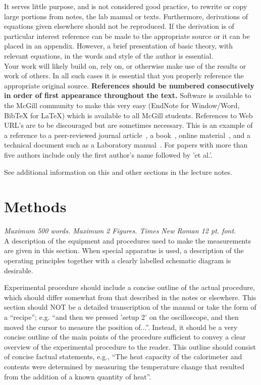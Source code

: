\documentclass[letterpaper,12pt]{article}
\begin{document}
It serves little purpose, and is not considered good practice, to
rewrite or copy large portions from notes, the lab manual or
texts. Furthermore, derivations of equations given elsewhere should
not be reproduced. If the derivation is of particular interest
reference can be made to the appropriate source or it can be placed in
an appendix. However, a brief presentation of basic theory, with
relevant equations, in the words and style of the author is
essential.\\

Your work will likely build on, rely on, or otherwise make use of the results or work of others.  In all such cases it is essential that you properly reference the appropriate
  original source.  {\bf References should be numbered consecutively in
  order of first appearance throughout the text.} Software is available
  to the McGill community to make this very easy (EndNote for
  Window/Word, BibTeX for LaTeX) which is available to all McGill
  students.  References to Web URL's are to be discouraged but are
  sometimes necessary.  This is an example of a reference to a peer-reviewed journal article~\cite{paper1}, a book~\cite{book1}, online material~\cite{link1}, and a technical document such as a Laboratory manual~\cite{LabManualX}.  For papers with more than five authors include only the first author's name followed by ’et al.’.

See additional information on this and other sections in the lecture
notes.





\section{Methods}
{\it Maximum 500 words. Maximum 2 Figures. Times New Roman 12
  pt. font.}\\


A description of the equipment and procedures used to make the
measurements are given in this section. When special apparatus is
used, a description of the operating principles together with a
clearly labelled schematic diagram is desirable. 

Experimental procedure should include a concise outline of the
        actual procedure, which should differ somewhat from that
        described in the notes or elsewhere. This section should NOT
        be a detailed transcription of the manual or take the form of
        a ``recipe''; e.g. ``and then we pressed 'setup 2' on the
        oscilloscope, and then moved the cursor to measure the
        position of...''. Instead, it should be a very concise outline
        of the main points of the procedure sufficient to convey a
        clear overview of the experimental procedure to the
        reader. This outline should consist of concise factual
        statements, e.g., ``The heat capacity of the calorimeter and
        contents were determined by measuring the temperature change
        that resulted from the addition of a known quantity of heat''.  
\end{document}
